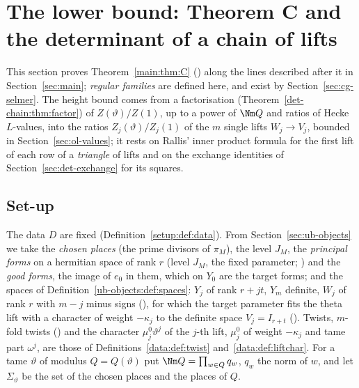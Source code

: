 \section{The lower bound: Theorem C and the determinant of a chain of lifts}\label{sec:det-chain}

This section proves Theorem~\ref{main:thm:C} () along the lines
described after it in Section~\ref{sec:main}; \emph{regular families} are defined here, and exist
by Section~\ref{sec:cg-selmer}. The height bound comes from a factorisation (Theorem~\ref{det-chain:thm:factor}) of
$Z(\vartheta)/Z(1)$, up to a power of $\Nm Q$ and ratios of Hecke $L$-values, into the ratios
$Z_j(\vartheta)/Z_j(1)$ of the $m$ single lifts $W_j\to V_j$, bounded in Section~\ref{sec:ol-values};
it rests on Rallis' inner product formula for the first lift of each row of a \emph{triangle} of
lifts and on the exchange identities of Section~\ref{sec:det-exchange} for its squares.

\subsection{Set-up}\label{det-chain:sec:setup}

The data $D$ are fixed (Definition~\ref{setup:def:data}). From Section~\ref{sec:ub-objects} we take
the \emph{chosen places} (the prime divisors of $\pi_M$), the level $J_M$, the \emph{principal
forms} on a hermitian space of rank $r$ (level $J_M$, the fixed parameter;
) and the \emph{good forms}, the image of $e_0$ in them, which on
$Y_0$ are the target forms; and the spaces of Definition~\ref{ub-objects:def:spaces}: $Y_j$ of rank
$r+jt$, $Y_m$ definite, $W_j$ of rank $r$ with $m-j$ minus signs
(), for which the target parameter fits the theta lift with a
character of weight $-\kappa_j$ to the definite space $V_j=I_{r+t}$
(). Twists, $m$-fold twists () and
the character $\mu_j^0\vartheta^j$ of the $j$-th lift, $\mu_j^0$ of weight $-\kappa_j$ and tame part
$\omega^j$, are those of Definitions~\ref{data:def:twist} and~\ref{data:def:liftchar}. For a tame
$\vartheta$ of modulus $Q=Q(\vartheta)$ put $\Nm Q=\prod_{w\in Q}q_w$, $q_w$ the norm of $w$, and let
$\Sigma_\vartheta$ be the set of the chosen places and the places of $Q$.

